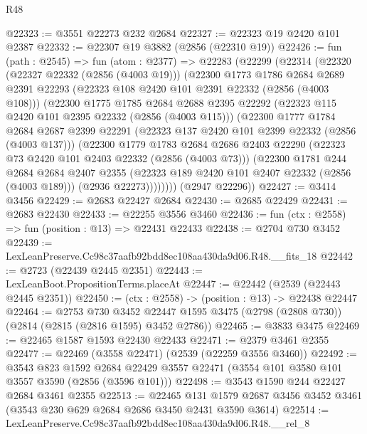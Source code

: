 \begin{lexlean}{R48}
\begin{coremodule}
@22323 := @3551 @22273 @232 @2684
@22327 := @22323 @19 @2420 @101 @2387
@22332 := @22307 @19 @3882 (@2856 (@22310 @19))
@22426 := fun (path : @2545) =>
  fun (atom : @2377) =>
  @22283
    (@22299
      (@22314
        (@22320
          (@22327 @22332 (@2856 (@4003 @19)))
          (@22300
            @1773
            @1786
            @2684
            @2689
            @2391
            @22293
            (@22323 @108 @2420 @101 @2391 @22332 (@2856 (@4003 @108)))
            (@22300
              @1775
              @1785
              @2684
              @2688
              @2395
              @22292
              (@22323 @115 @2420 @101 @2395 @22332 (@2856 (@4003 @115)))
              (@22300
                @1777
                @1784
                @2684
                @2687
                @2399
                @22291
                (@22323 @137 @2420 @101 @2399 @22332 (@2856 (@4003 @137)))
                (@22300
                  @1779
                  @1783
                  @2684
                  @2686
                  @2403
                  @22290
                  (@22323 @73 @2420 @101 @2403 @22332 (@2856 (@4003 @73)))
                  (@22300
                    @1781
                    @244
                    @2684
                    @2684
                    @2407
                    @2355
                    (@22323 @189 @2420 @101 @2407 @22332 (@2856 (@4003 @189)))
                    (@2936 @22273))))))))
      (@2947 @22296))
@22427 := @3414 @3456
@22429 := @2683 @22427 @2684
@22430 := @2685 @22429
@22431 := @2683 @22430
@22433 := @22255 @3556 @3460
@22436 := fun (ctx : @2558) => fun (position : @13) => @22431 @22433
@22438 := @2704 @730 @3452
@22439 := LexLeanPreserve.Cc98c37aafb92bdd8ec108aa430da9d06.R48.__fits_18
@22442 := @2723 (@22439 @2445 @2351)
@22443 := LexLeanBoot.PropositionTerms.placeAt
@22447 := @22442 (@2539 (@22443 @2445 @2351))
@22450 := (ctx : @2558) -> (position : @13) -> @22438 @22447
@22464 := @2753
    @730
    @3452
    @22447
    @1595
    @3475
    (@2798 (@2808 @730))
    (@2814 (@2815 (@2816 @1595) @3452 @2786))
@22465 := @3833 @3475
@22469 := @22465 @1587 @1593 @22430 @22433
@22471 := @2379 @3461 @2355
@22477 := @22469 (@3558 @22471) (@2539 (@22259 @3556 @3460))
@22492 := @3543
    @823
    @1592
    @2684
    @22429
    @3557
    @22471
    (@3554 @101 @3580 @101 @3557 @3590 (@2856 (@3596 @101)))
@22498 := @3543 @1590 @244 @22427 @2684 @3461 @2355
@22513 := @22465
    @131
    @1579
    @2687
    @3456
    @3452
    @3461
    (@3543 @230 @629 @2684 @2686 @3450 @2431 @3590 @3614)
@22514 := LexLeanPreserve.Cc98c37aafb92bdd8ec108aa430da9d06.R48.__rel_8

\end{coremodule}
\end{lexlean}
